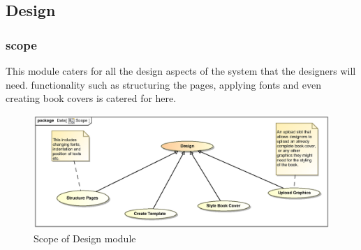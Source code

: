 \clearpage
\subsection{Design}

\subsubsection{scope}
\par{This module caters for all the design aspects of the system that the designers will need. functionality such as structuring the pages, applying fonts and even creating book covers is catered for here.}

\begin{figure}[h]
\includegraphics[scale=0.9,width=450px]{epsImages/Design/Scope.eps}
\centering
\caption{Scope of Design module}
\end{figure}

\newpage
